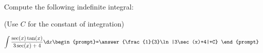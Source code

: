 \documentclass{ximera}
\author{Jim Talamo}
\begin{document}
\begin{exercise}
Compute the following indefinite integral:

\begin{prompt} (Use $C$ for the constant of integration) \end{prompt}

\[
\int \frac{\sec(x)\tan(x)}{3\sec(x) +4} \d x 
\begin{prompt}=\answer{\frac{1}{3}\ln|3\sec(x)+4|+C} \end{prompt}
\]
\end{exercise}
\end{document}
